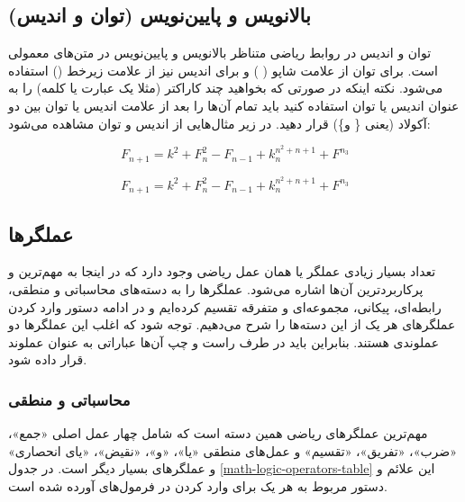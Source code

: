 \subsection{بالانویس و پایین‌نویس (توان و اندیس)}
توان و اندیس در روابط ریاضی متناظر بالانویس و پایین‌نویس در متن‌های معمولی است.
برای توان از علامت شاپو ( \lr{$\^$} ) و برای اندیس نیز از علامت
زیرخط (\lr{\_}) استفاده می‌شود. نکته اینکه در صورتی که
بخواهید چند کاراکتر (مثلا یک عبارت یا کلمه) را به عنوان اندیس یا توان استفاده
کنید باید تمام آن‌ها را بعد از علامت اندیس یا توان بین دو آکولاد (یعنی \{ و\})
قرار دهید. در زیر مثال‌هایی از اندیس و توان مشاهده می‌شود:

\begin{latex}
\[
F_{n+1} = k^2 + F_n^2 - F_{n-1} + k^{n^2+n+1}_n + F^{n_3}
\]
\end{latex}

\[
 F_{n+1} = k^2 + F_n^2 - F_{n-1} + k^{n^2+n+1}_n + F^{n_3}
\]

\subsection{عملگرها}
تعداد بسیار زیادی عملگر یا همان عمل ریاضی وجود دارد که در اینجا به مهم‌ترین و
پرکاربردترین آن‌‌ها اشاره می‌شود. عملگرها را به دسته‌های محاسباتی و منطقی،
رابطه‌ای، پیکانی، مجموعه‌ای و متفرقه تقسیم کرده‌ایم و در ادامه دستور وارد کردن
عملگرهای هر یک از این دسته‌ها را شرح می‌دهیم. توجه شود که اغلب این عملگرها دو
عملوندی هستند. بنابراین باید در طرف راست و چپ آن‌ها عباراتی به عنوان عملوند قرار
داده شود.
\subsubsection{محاسباتی و منطقی}
مهم‌ترین عملگرهای ریاضی همین دسته است که شامل چهار عمل اصلی «جمع»، «ضرب»،
«تفریق»، «تقسیم» و عمل‌های منطقی «یا»، «و»،
«نقیض»، «یای انحصاری» و عملگرهای بسیار دیگر
است. در جدول \ref{math-logic-operators-table} این علائم و دستور مربوط به هر یک برای وارد کردن در فرمول‌های
\lr{\LaTeX} آورده شده است.


